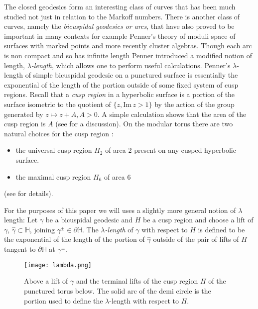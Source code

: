 \documentclass[12pt,a4paper]{amsart}
\def\HH{\mathbb{H}}
\def\im{\mathrm{Im}\,}
\begin{document}
The closed geodesics form an interesting class of curves that has been much
studied not just in relation to the Markoff numbers. There is another class of
curves, namely the \textit{bicuspidal geodesics or arcs}, that have also proved
to be important in many contexts for example Penner's theory of moduli space of
surfaces with marked points and more recently cluster algebras. Though each arc
is non compact and so has infinite length Penner \cite{bob} introduced a
modified notion of length, \textit{$\lambda$-length}, which allows one to
perform useful calculations.  Penner's $\lambda$-length of simple bicuspidal
geodesic on a punctured surface is essentially the exponential of  the length
of the portion outside of some fixed system of cusp regions. Recall that a
\textit{cusp region} in a hyperbolic surface is a portion of the surface
isometric to  the quotient of $\{ z, \im z > 1\}$ by the action of the group
generated by $z \mapsto z + A, A > 0$. A simple calculation shows that the area
of the cusp region is $A$ (see \cite{thesis} for a discussion). On the modular
torus there are two natural choices for the cusp region :

\begin{itemize}
\item the universal cusp region $H_2$  of area $2$ present on any cusped hyperbolic surface.
\item the  maximal cusp region $H_6$ of area $6$ 
\end{itemize}
(see \cite{thesis} for details).

For the purposes of this paper we will uses a slightly more general notion of
$\lambda$ length: Let $\gamma$ be a bicuspidal geodesic and $H$ be a cusp
region and choose a lift of  
$\gamma$, $\hat{\gamma}\subset \HH$,
joining $\gamma^\pm \in \partial \HH$.
The \textit{$\lambda$-length} of $\gamma$ with respect to $H$ is
defined to be the exponential of the length of the portion of $\hat{\gamma}$ 
outside of the pair of lifts of $H$ tangent to $\partial \HH$ at $\gamma^\pm$.

\begin{figure}[ht]
\begin{center}
\texttt{[image: lambda.png]}
\end{center}
\caption{Above a lift of $\gamma$ and the terminal lifts of the cusp region $H$ of the punctured torus below.
The solid arc of the demi circle is the portion used to define the $\lambda$-length  with respect to $H$.}
	\label{fig:lambda length}
\end{figure}
\end{document}
